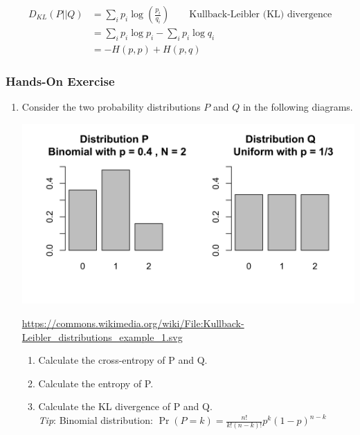 \begin{align*}
D_{KL}(P || Q) &= \sum_i p_i \log \left( \frac{p_i}{q_i} \right) \qquad \text{Kullback-Leibler (KL) divergence}\\
  & = \sum_i p_i \log p_i - \sum_i p_i \log q_i \\
  & = - H(p, p) + H(p, q)
\end{align*}

\begin{tcolorbox}[colback=code]
\subsubsection*{Hands-On Exercise}

\begin{enumerate}
\item Consider the two probability distributions $P$ and $Q$ in the following diagrams. \begin{center}
\includegraphics[width=.5\textwidth]{kl.png}

\tiny \url{https://commons.wikimedia.org/wiki/File:Kullback-Leibler_distributions_example_1.svg}
\normalsize
\end{center}

\begin{enumerate}
   \item Calculate the cross-entropy of P and Q.
   \item Calculate the entropy of P.
   \item Calculate the KL divergence of P and Q. \\
   \vspace{-8mm}
\emph{Tip}: Binomial distribution: $\Pr(P=k) = \frac{n!}{k!(n-k)!} p^k (1-p)^{n-k}$ \\
\end{enumerate}


\end{enumerate}
\end{tcolorbox}
